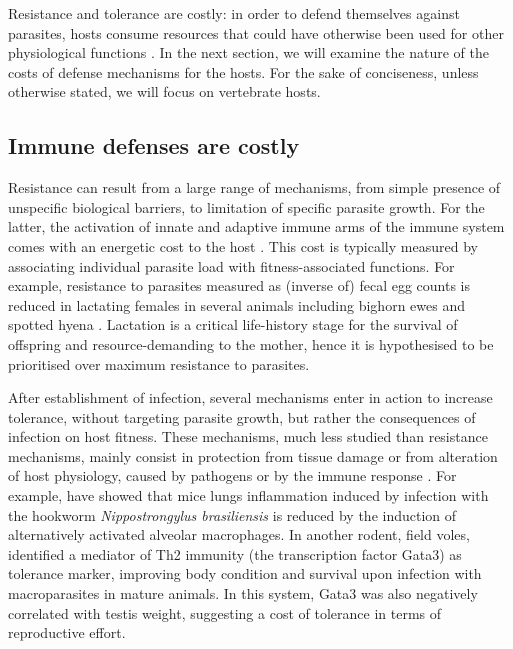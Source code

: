 \par
Resistance and tolerance are costly: in order to defend themselves against parasites, hosts consume resources that could have otherwise been used for other physiological functions \citep{sheldon_ecological_1996}. In the next section, we will examine the nature of the costs of defense mechanisms for the hosts. For the sake of conciseness, unless otherwise stated, we will focus on vertebrate hosts.

\subsection{Immune defenses are costly}
Resistance can result from a large range of mechanisms, from simple presence of unspecific biological barriers, to limitation of specific parasite growth. For the latter, the activation of innate and adaptive immune arms of the immune system comes with an energetic cost to the host \citep{schmid-hempel_evolutionary_2013}. This cost is typically measured by associating individual parasite load with fitness-associated functions. For example, resistance to parasites measured as (inverse of) fecal egg counts is reduced in lactating females in several animals including bighorn ewes \citep{festa-bianchet_individual_1989} and spotted hyena \citep{east_does_2015}. Lactation is a critical life-history stage for the survival of offspring and resource-demanding to the mother, hence it is hypothesised to be prioritised over maximum resistance to parasites.
\par
After establishment of infection, several mechanisms enter in action to increase tolerance, without targeting parasite growth, but rather the consequences of infection on host fitness. These mechanisms, much less studied than resistance mechanisms, mainly consist in protection from tissue damage or from alteration of host physiology, caused by pathogens or by the immune response \citep{medzhitov_disease_2012}. For example, \cite{reece_innate_2006} have showed that mice lungs inflammation induced by infection with the hookworm \textit{Nippostrongylus brasiliensis} is reduced by the induction of alternatively activated alveolar macrophages. In another rodent, field voles, \cite{jackson_immunological_2014} identified a mediator of Th2 immunity (the transcription factor Gata3) as tolerance marker, improving body condition and survival upon infection with macroparasites in mature animals. In this system, Gata3 was also negatively correlated with testis weight, suggesting a cost of tolerance in terms of reproductive effort.

